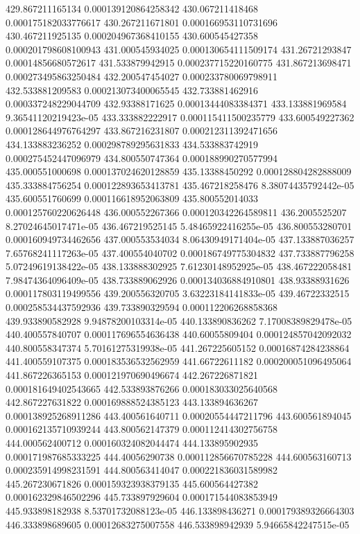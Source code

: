{429.867211165134 0.000139120864258342
430.067211418468 0.000175182033776617
430.267211671801 0.000166953110731696
430.467211925135 0.000204967368410155
430.600545427358 0.000201798608100943
431.000545934025 0.000130654111509174
431.26721293847 0.00014856680572617
431.533879942915 0.000237715220160775
431.867213698471 0.000273495863250484
432.200547454027 0.000233780069798911
432.533881209583 0.000213073400065545
432.733881462916 0.000337248229044709
432.93388171625 0.00013444083384371
433.133881969584 9.36541120219423e-05
433.333882222917 0.000115411500235779
433.600549227362 0.000128644976764297
433.867216231807 0.000212311392471656
434.133883236252 0.000298789295631833
434.533883742919 0.000275452447096979
434.800550747364 0.000188990270577994
435.000551000698 0.000137024620128859
435.13388450292 0.000128804282888009
435.333884756254 0.000122893653413781
435.467218258476 8.38074435792442e-05
435.600551760699 0.000116618952063809
435.800552014033 0.000125760220626448
436.000552267366 0.000120342264589811
436.2005525207 8.27024645017471e-05
436.467219525145 5.48465922416255e-05
436.800553280701 0.000160949734462656
437.000553534034 8.06430949171404e-05
437.133887036257 7.65768241117263e-05
437.400554040702 0.000186749775304832
437.733887796258 5.07249619138422e-05
438.133888302925 7.61230148952925e-05
438.467222058481 7.98474364096409e-05
438.733889062926 0.000134036884910801
438.93388931626 0.000117803119499556
439.200556320705 3.63223184141833e-05
439.46722332515 0.000258534437592936
439.733890329594 0.000112206268858368
439.933890582928 9.94878200103314e-05
440.133890836262 7.17008389829478e-05
440.400557840707 0.000117696554636438
440.60055809404 0.000124857042092032
440.800558347374 5.70161275319938e-05
441.267225605152 0.00016874284238864
441.400559107375 0.000183536532562959
441.66722611182 0.000200051096495064
441.867226365153 0.000121970690496674
442.267226871821 0.000181649402543665
442.533893876266 0.000183033025640568
442.867227631822 0.000169888524385123
443.133894636267 0.000138925268911286
443.400561640711 0.00020554447211796
443.600561894045 0.000162135710939244
443.800562147379 0.000112414302756758
444.000562400712 0.000160324082044474
444.133895902935 0.000171987685333225
444.40056290738 0.000112856670785228
444.600563160713 0.000235914998231591
444.800563414047 0.000221836031589982
445.267230671826 0.000159323938379135
445.600564427382 0.000162329846502296
445.733897929604 0.000171544083853949
445.933898182938 8.53701732088123e-05
446.133898436271 0.000179389326664303
446.333898689605 0.00012683275007558
446.533898942939 5.94665842247515e-05
}
